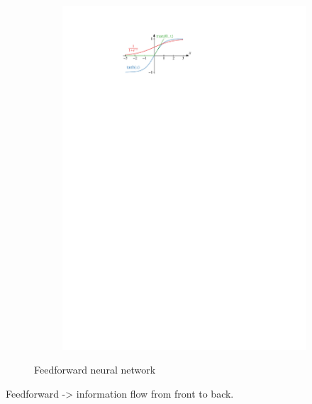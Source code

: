 \begin{figure}[ht]
\begin{subfigure}[t]{0.4\textwidth}
    \includegraphics{./figures/theory/activation_functions.pdf}
    \label{fig:activation_functions}
  \end{subfigure}
  \caption{Feedforward neural network}
\end{figure}

Feedforward -> information flow from front to back.

